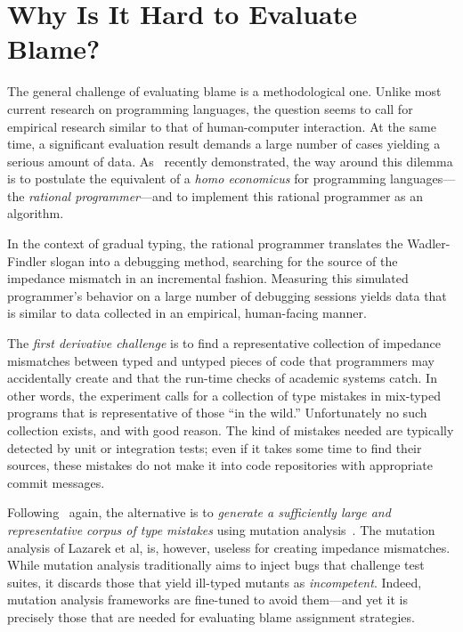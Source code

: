 \section{Why Is It Hard to Evaluate Blame?}
\label{sec:challenges}


The general challenge of evaluating blame is a methodological one. Unlike most
current research on programming languages, the question seems to call for
empirical research similar to that of human-computer interaction. At the same
time, a significant evaluation result demands a large number of cases yielding a
serious amount of data. As~\citet{lksfd-popl-2020} recently demonstrated, the
way around this dilemma is to postulate the equivalent of a {\it homo
economicus\/} for programming languages---the {\em rational programmer\/}---and
to implement this rational programmer as an algorithm.

In the context of gradual typing, the rational programmer translates the
Wadler-Findler slogan into a debugging method, searching for the source of the
impedance mismatch in an incremental fashion. Measuring this simulated
programmer's behavior on a large number of debugging sessions yields data that
is similar to data collected in an empirical, human-facing manner.

The {\em first derivative challenge\/} is to find a representative collection of
impedance mismatches between typed and untyped pieces of code that programmers
may accidentally create and that the run-time checks of academic systems
catch. In other words, the experiment calls for a collection of type mistakes in
mix-typed programs that is representative of those ``in the wild.''
Unfortunately no such collection exists, and with good reason. The kind of
mistakes needed are typically detected by unit or integration tests; even if it
takes some time to find their sources, these mistakes do not make it into code
repositories with appropriate commit messages.

Following~\citet{lksfd-popl-2020} again, the alternative is to {\em generate a
sufficiently large and representative corpus of type mistakes \/} using mutation
analysis~\cite{lipton1971fault, demillo1978hints, jia2011analysis}.  The
mutation analysis of Lazarek et al, is, however, useless for creating impedance
mismatches.  While mutation analysis traditionally aims to inject bugs that
challenge test suites, it discards those that yield ill-typed mutants as
\emph{incompetent}.  Indeed, mutation analysis frameworks are fine-tuned to
avoid them---and yet it is precisely those that are needed for evaluating blame
assignment strategies.

